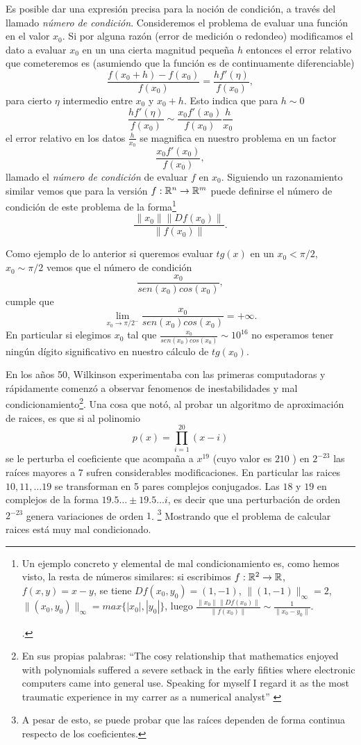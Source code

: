 \begin{tcolorbox}
Es posible dar una expresión precisa para la noción de condición, a través del llamado
\emph{número de condición}. Consideremos el problema de evaluar una función en el valor $x_0$. Si por alguna razón (error de medición o redondeo) modificamos el dato a evaluar $x_0$ en un una cierta magnitud pequeña $h$ entonces el error relativo que cometeremos es (asumiendo que la función es de continuamente diferenciable)
$$
\frac{f(x_0+h)-f(x_0)}{f(x_0)}=
\frac{hf'(\eta)}{f(x_0)},$$
para cierto $\eta$ intermedio entre $x_0$ y $x_0+h$. Esto indica que para $h\sim 0$
$$
\frac{hf'(\eta)}{f(x_0)}\sim
\frac{x_0f'(x_0)}{f(x_0)}\frac{h}{x_0}
$$
el error relativo en los datos $\frac{h}{x_0}$ se magnifica en nuestro problema en un factor
$$
\frac{x_0f'(x_0)}{f(x_0)},
$$
llamado el \emph{número de condición} de evaluar $f$ en $x_0$. Siguiendo un razonamiento similar vemos que para la versión $f:\mathbb R^{n}\to \mathbb R^{m}$ puede definirse el número de condición de este problema de la forma\footnote{Un ejemplo concreto y elemental de mal condicionamiento es, como hemos visto, la resta de números similares: si escribimos
$f:\mathbb R^2\to \mathbb R$, $f(x,y)=x-y$, se tiene $Df(x_0,y_0)=(1,-1)$, $\|(1,-1)\|_{\infty}=2$, $\|(x_0,y_0)\|_{\infty}=max\{|x_0|,|y_0|\}$, luego $\frac{\|x_0\|\|Df(x_0)\|}{\|f(x_0)\|}\sim \frac{1}{\|x_0-y_0\|}.$

.} $$
\frac{\|x_0\|\|Df(x_0)\|}{\|f(x_0)\|}.
$$
\end{tcolorbox}
Como ejemplo de lo anterior
si queremos evaluar $tg(x)$ en un $x_0<\pi/2$, $x_0\sim \pi/2$ vemos que el número de condición
$$
\frac{x_0}{sen(x_0)cos(x_0)},
$$
cumple que
$$
\lim_{x_0\to \pi/2^-} \frac{x_0}{sen(x_0)cos(x_0)}=+\infty.
$$
En particular si elegimos  $x_0$ tal que $\frac{x_0}{sen(x_0)cos(x_0)}\sim 10^{16}$ no esperamos tener ningún dígito significativo en nuestro cálculo de $tg(x_0)$.


En los años 50, Wilkinson experimentaba con las primeras computadoras y rápidamente comenzó a observar fenomenos de inestabilidades y mal condicionamiento\footnote{En sus propias palabras: ``The cosy relationship that mathematics enjoyed with polynomials suffered a severe setback in the early fifities where electronic computers came into general use. Speaking for myself I regard it as the most traumatic experience in my carrer as a numerical analyst'' \cite{Wil}  }. Una cosa que notó, al probar un algoritmo de aproximación de raices, es que si al polinomio
$$
p(x)=\prod_{i=1}^{20}(x-i)
$$
se le perturba el coeficiente que acompaña a $x^{19}$ (cuyo valor es $210$ ) en $2^{-23}$ las raíces mayores a $7$ sufren considerables modificaciones. En particular las raices  $10,11,\dots 19$
se transforman en 5 pares complejos conjugados. Las $18$ y $19$ en complejos de la forma $19.5\dots\pm 19.5\dots i$, es decir que una perturbación de orden $2^{-23}$ genera variaciones de orden $1$. \footnote{A pesar de esto, se puede probar que las raíces dependen de forma continua respecto de los coeficientes.} Mostrando que el problema de calcular raices está muy mal condicionado.

